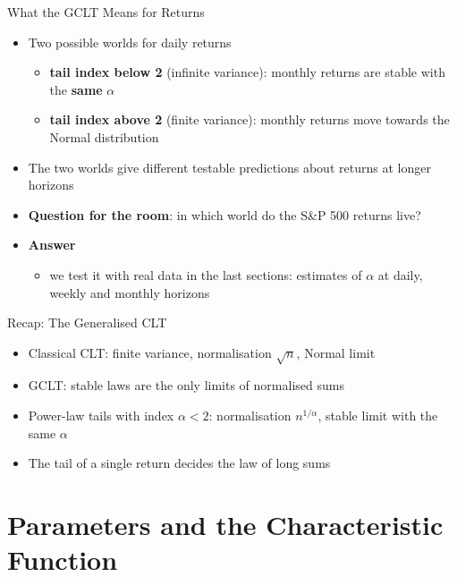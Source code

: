 \begin{frame}{What the GCLT Means for Returns}
\itemsize{\small}
\begin{itemize}
    \item Two possible worlds for daily returns
    \begin{itemize}
        \item \textbf{tail index below 2} (infinite variance): monthly returns are stable with the \textbf{same} $\alpha$
        \item \textbf{tail index above 2} (finite variance): monthly returns move towards the Normal distribution
    \end{itemize}
    \item The two worlds give different testable predictions about returns at longer horizons
    \item \textbf{Question for the room}: in which world do the S\&P 500 returns live?
    \item \textbf{Answer}
    \begin{itemize}
        \item we test it with real data in the last sections: estimates of $\alpha$ at daily, weekly and monthly horizons
    \end{itemize}
\end{itemize}
\end{frame}

\begin{frame}{Recap: The Generalised CLT}
\itemsize{\small}
\begin{itemize}
    \item Classical CLT: finite variance, normalisation $\sqrt{n}$, Normal limit
    \item GCLT: stable laws are the only limits of normalised sums
    \item Power-law tails with index $\alpha < 2$: normalisation $n^{1/\alpha}$, stable limit with the same $\alpha$
    \item The tail of a single return decides the law of long sums
\end{itemize}
\end{frame}


\section{Parameters and the Characteristic Function}

